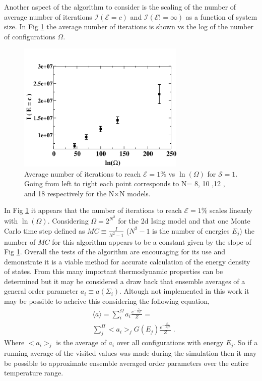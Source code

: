\documentclass[twocolumn]{article}
\begin{document}
  Another aspect of the algorithm to consider is the scaling of the number of average number of iterations $\mathcal{I}(\mathcal{E}=c)$ and $\mathcal{I}(\mathcal{E}!=\infty)$ as a function of system size. In Fig \ref{its_vs_logomega}  the average number of iterations is shown vs the log of the number of configurations $\Omega$. 
\begin{figure}[h!]
\includegraphics[width=8cm]{its_vs_logomega.png}
\caption{\label{its_vs_logomega}Average number of iterations to reach $\mathcal{E}=1\%$ vs  $\ln(\Omega)$ for $\mathcal{S}=1$. Going from left to right each point corresponds to N= 8, 10 ,12 , and 18 respectively for the N$\times$N models.  }
\end{figure}
In Fig \ref{its_vs_logomega} it appears that the number of iterations to reach $\mathcal{E}=1\%$ scales linearly with $\ln(\Omega)$. Considering $\Omega=2^{N^2}$ for the 2d Ising model and that  one Monte Carlo time step defined as $MC \equiv  \frac{I}{N^2 -1}$ ($N^2-1$ is the number of energies $E_j$) the number of $MC$ for this algorithm appears to be a constant given by the slope of Fig \ref{its_vs_logomega}. Overall the tests of the algorithm are encouraging for its use and demonstrate it is a viable method for accurate calculation of the energy density of states. From this many important thermodynamic properties can be determined but it may be considered a draw back that ensemble averages of a general order parameter $a_i \equiv a(\Sigma_i)$. Altough not implemented in this work it may be possible to acheive this considering the following equation, 
\begin{equation}
\begin{split}
&\langle a \rangle = \sum_i^{\Omega}a_i \frac{ e^{- \frac{e_i}{K_bT}  }}{Z} = \\
&\sum_j^{\Pi}<a_i>_{j}G(E_j)\frac{e^{-\frac{E_J}{K_bT} }}{Z} \; . 
\end{split} 
\end{equation}
Where $<a_i>_{j}$ is the average of $a_i$ over all configurations with energy $E_j$. So if a running average of the visited values was made during the simulation then it may be possible to approximate ensemble averaged order parameters over the entire temperature range.  


\end{document}
